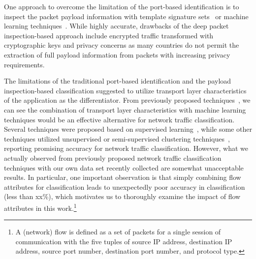 \documentclass[conference]{IEEEtran}
\begin{document}
One approach to overcome the limitation of the port-based identification is to inspect the packet payload information with template signature sets~\cite{conf/IEEEcit/YeXWP09,DBLP:conf/noms/ParkWKH08} or machine learning techniques~\cite{ACAS}.
While highly accurate,  drawbacks of the deep packet inspection-based approach include encrypted traffic transformed with cryptographic keys and privacy concerns as many countries do not permit the extraction of full payload information from packets with increasing privacy requirements.

The limitations of the traditional port-based identification and the payload inspection-based classification suggested to utilize  transport layer characteristics of the application as the differentiator. From previously proposed techniques~\cite{}, we can see the combination of transport layer characteristics with machine learning techniques would be an effective alternative for network traffic classification. %
Several techniques were proposed based on supervised learning~\cite{}, while some other techniques utilized unsupervised or semi-supervised clustering techniques~\cite{}, reporting promising  accuracy for network traffic classification.
However, what we actually observed from previously proposed network traffic classification techniques with our own data set recently collected are somewhat unacceptable results. In particular, one important observation is that simply combining flow attributes for classification leads to unexpectedly poor accuracy in classification (less than xx\%), which motivates us to thoroughly examine the impact of flow attributes in this work.\footnote{A (network) flow is defined as a set of packets for a single session of communication with the five tuples of source IP address, destination IP address, source port number, destination port number, and protocol type.}

\end{document}
